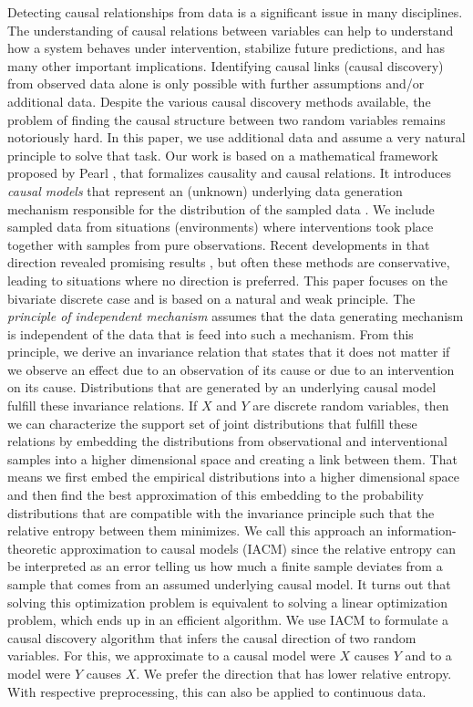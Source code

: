 \documentclass[letterpaper]{article}
\begin{document}
Detecting causal relationships from data is a significant issue in many disciplines. The understanding of causal relations between variables can help to understand how a system behaves under intervention, stabilize future predictions, and has many other important implications. Identifying causal links (causal discovery) from observed data alone is only possible with further assumptions and/or additional data. Despite the various causal discovery methods available, the problem of finding the causal structure between two random variables remains notoriously hard. In this paper, we use additional data and assume a very natural principle to solve that task. Our work is based on a mathematical framework proposed by Pearl \cite{Pea09}, that formalizes causality and causal relations. It introduces {\em causal models} that represent an (unknown) underlying data generation mechanism responsible for the distribution of the sampled data \cite{PJS17}. We include sampled data from situations (environments) where interventions took place together with samples from pure observations. Recent developments in that direction revealed promising results \cite{PBM16, HPM18}, but often these methods are conservative, leading to situations where no direction is preferred. This paper focuses on the bivariate discrete case and is based on a natural and weak principle. The {\em principle of independent mechanism} assumes that the data generating mechanism is independent of the data that is feed into such a mechanism. From this principle, we derive an invariance relation that states that it does not matter if we observe an effect due to an observation of its cause or due to an intervention on its cause. Distributions that are generated by an underlying causal model fulfill these invariance relations. If $X$ and $Y$ are discrete random variables, then we can characterize the support set of joint distributions that fulfill these relations by embedding the distributions from observational and interventional samples into a higher dimensional space and creating a link between them. That means we first embed the empirical distributions into a higher dimensional space and then find the best approximation of this embedding to the probability distributions that are compatible with the invariance principle such that the relative entropy between them minimizes. We call this approach an information-theoretic approximation to causal models (IACM) since the relative entropy can be interpreted as an error telling us how much a finite sample deviates from a sample that comes from an assumed underlying causal model. It turns out that solving this optimization problem is equivalent to solving a linear optimization problem, which ends up in an efficient algorithm. We use IACM to formulate a causal discovery algorithm that infers the causal direction of two random variables. For this, we approximate to a causal model were $X$ causes $Y$ and to a model were $Y$ causes $X$. We prefer the direction that has lower relative entropy. With respective preprocessing, this can also be applied to continuous data.
\end{document}
